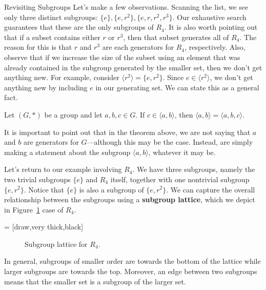 \begin{section}{Revisiting Subgroups}
Let's make a few observations.  Scanning the list, we see only three distinct subgroups: $\{e\}, \{e,r^2\},\{e,r,r^2,r^3\}$.  Our exhaustive search guarantees that these are the only subgroups of $R_4$.  It is also worth pointing out that if a subset contains either $r$ or $r^3$, then that subset generates all of $R_4$.  The reason for this is that $r$ and $r^3$ are each generators for $R_4$, respectively.  Also, observe that if we increase the size of the subset using an element that was already contained in the subgroup generated by the smaller set, then we don't get anything new.  For example, consider $\langle r^2\rangle=\{e,r^2\}$.  Since $e\in\langle r^2\rangle$, we don't get anything new by including $e$ in our generating set.  We can state this as a general fact.

\begin{theorem}
Let $(G,*)$ be a group and let $a,b,c\in G$.  If $c\in\langle a,b\rangle$, then $\langle a,b\rangle = \langle a,b,c\rangle$.
\end{theorem}

It is important to point out that in the theorem above, we are not saying that $a$ and $b$ are generators for $G$---although this may be the case.  Instead, are simply making a statement about the subgroup $\langle a,b\rangle$, whatever it may be.

Let's return to our example involving $R_4$.  We have three subgroups, namely the two trivial subgroups $\{e\}$ and $R_4$ itself, together with one nontrivial subgroup $\{e,r^2\}$.  Notice that $\{e\}$ is also a subgroup of $\{e,r^2\}$.  We can capture the overall relationship between the subgroups using a \textbf{subgroup lattice}, which we depict in Figure~\ref{fig:latticeR4} case of $R_4$.

 = [draw,very thick,black]

\begin{figure}[!ht]
\centering
{}
\caption{Subgroup lattice for $R_4$.}
\label{fig:latticeR4}
\end{figure}

In general, subgroups of smaller order are towards the bottom of the lattice while larger subgroups are towards the top.  Moreover, an edge between two subgroups means that the smaller set is a subgroup of the larger set.


\end{section}
